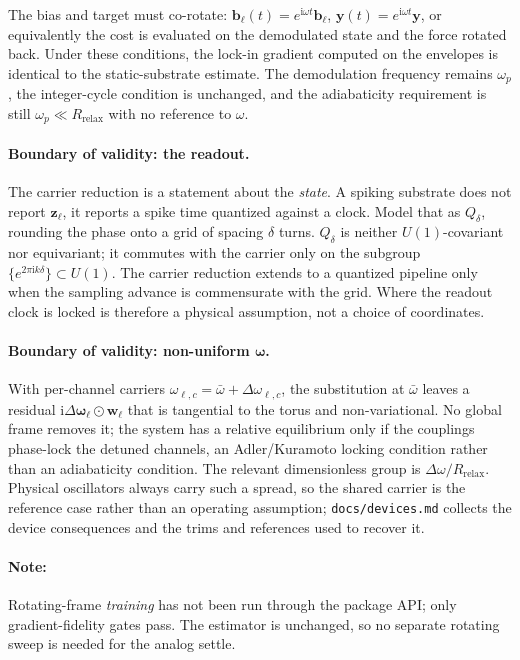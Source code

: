 \documentclass[11pt]{article}
\newcommand{\im}{\mathrm{i}}
\theoremstyle{definition}
\begin{document}
The bias and target must co-rotate: $\bm{b}_\ell(t)=e^{\im\omega
t}\bm{b}_\ell$, $\bm{y}(t)=e^{\im\omega t}\bm{y}$, or equivalently
the cost is evaluated on the demodulated state and the force rotated
back.  Under these conditions, the lock-in gradient computed on the
envelopes is identical to the static-substrate estimate.  The
demodulation frequency remains $\omega_p$, the integer-cycle condition
is unchanged, and the adiabaticity requirement is still $\omega_p \ll
R_{\mathrm{relax}}$ with no reference to $\omega$.

\paragraph{Boundary of validity: the readout.}
The carrier reduction is a statement about the \emph{state}.  A
spiking substrate does not report $\bm{z}_\ell$, it reports a spike
time quantized against a clock.  Model that as $Q_\delta$, rounding
the phase onto a grid of spacing $\delta$ turns.  $Q_\delta$ is
neither $U(1)$-covariant nor equivariant; it commutes with the carrier
only on the subgroup $\{e^{2\pi\im k\delta}\}\subset U(1)$.  The
carrier reduction extends to a quantized pipeline only when the
sampling advance is commensurate with the grid.  Where the readout
clock is locked is therefore a physical assumption, not a choice of
coordinates.

\paragraph{Boundary of validity: non-uniform $\bm{\omega}$.}
With per-channel carriers $\omega_{\ell,c} = \bar\omega +
\Delta\omega_{\ell,c}$, the substitution at $\bar\omega$ leaves a
residual $\im\Delta\bm{\omega}_\ell\odot\bm{w}_\ell$ that is
tangential to the torus and non-variational.  No global frame removes
it; the system has a relative equilibrium only if the couplings
phase-lock the detuned channels, an Adler/Kuramoto locking condition
rather than an adiabaticity condition.  The relevant dimensionless
group is $\Delta\omega / R_{\mathrm{relax}}$.  Physical oscillators always
carry such a spread, so the shared carrier is the reference case rather than
an operating assumption; \texttt{docs/devices.md} collects the device
consequences and the trims and references used to recover it.

\paragraph{Note:} Rotating-frame \emph{training} has not been run
through the package API; only gradient-fidelity gates pass.  The
estimator is unchanged, so no separate rotating sweep is needed for
the analog settle.
\end{document}
